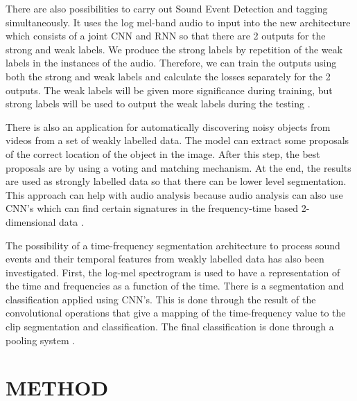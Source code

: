 \documentclass[journal]{IEEEtran}
\begin{document}
There are also possibilities to carry out Sound Event Detection and tagging simultaneously. It uses the log mel-band audio to input into the new architecture which consists of a joint CNN and RNN so that there are 2 outputs for the strong and weak labels. We produce the strong labels by repetition of the weak labels in the instances of the audio. Therefore, we can train the outputs using both the strong and weak labels and calculate the losses separately for the 2 outputs. The weak labels will be given more significance during training, but strong labels will be used to output the weak labels during the testing \cite{8}.

There is also an application for automatically discovering noisy objects from videos from a set of weakly labelled data. The model can extract some proposals of the correct location of the object in the image. After this step, the best proposals are by using a voting and matching mechanism. At the end, the results are used as strongly labelled data so that there can be lower level segmentation. This approach can help with audio analysis because audio analysis can also use CNN’s which can find certain signatures in the frequency-time based 2-dimensional data \cite{9}.

The possibility of a time-frequency segmentation architecture to process sound events and their temporal features from weakly labelled data has also been investigated. First, the log-mel spectrogram is used to have a representation of the time and frequencies as a function of the time. There is a segmentation and classification applied using CNN’s. This is done through the result of the convolutional operations that give a mapping of the time-frequency value to the clip segmentation and classification. The final classification is done through a pooling system \cite{10}.



\section{METHOD}
\end{document}
